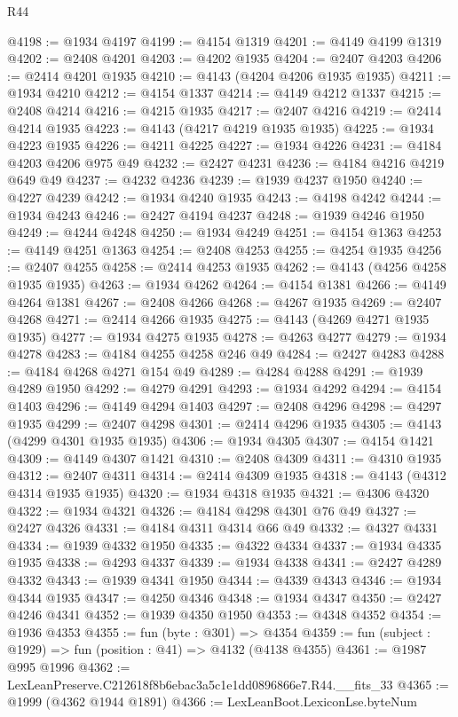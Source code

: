 \begin{lexlean}{R44}
\begin{coremodule}
@4198 := @1934 @4197
@4199 := @4154 @1319
@4201 := @4149 @4199 @1319
@4202 := @2408 @4201
@4203 := @4202 @1935
@4204 := @2407 @4203
@4206 := @2414 @4201 @1935
@4210 := @4143 (@4204 @4206 @1935 @1935)
@4211 := @1934 @4210
@4212 := @4154 @1337
@4214 := @4149 @4212 @1337
@4215 := @2408 @4214
@4216 := @4215 @1935
@4217 := @2407 @4216
@4219 := @2414 @4214 @1935
@4223 := @4143 (@4217 @4219 @1935 @1935)
@4225 := @1934 @4223 @1935
@4226 := @4211 @4225
@4227 := @1934 @4226
@4231 := @4184 @4203 @4206 @975 @49
@4232 := @2427 @4231
@4236 := @4184 @4216 @4219 @649 @49
@4237 := @4232 @4236
@4239 := @1939 @4237 @1950
@4240 := @4227 @4239
@4242 := @1934 @4240 @1935
@4243 := @4198 @4242
@4244 := @1934 @4243
@4246 := @2427 @4194 @4237
@4248 := @1939 @4246 @1950
@4249 := @4244 @4248
@4250 := @1934 @4249
@4251 := @4154 @1363
@4253 := @4149 @4251 @1363
@4254 := @2408 @4253
@4255 := @4254 @1935
@4256 := @2407 @4255
@4258 := @2414 @4253 @1935
@4262 := @4143 (@4256 @4258 @1935 @1935)
@4263 := @1934 @4262
@4264 := @4154 @1381
@4266 := @4149 @4264 @1381
@4267 := @2408 @4266
@4268 := @4267 @1935
@4269 := @2407 @4268
@4271 := @2414 @4266 @1935
@4275 := @4143 (@4269 @4271 @1935 @1935)
@4277 := @1934 @4275 @1935
@4278 := @4263 @4277
@4279 := @1934 @4278
@4283 := @4184 @4255 @4258 @246 @49
@4284 := @2427 @4283
@4288 := @4184 @4268 @4271 @154 @49
@4289 := @4284 @4288
@4291 := @1939 @4289 @1950
@4292 := @4279 @4291
@4293 := @1934 @4292
@4294 := @4154 @1403
@4296 := @4149 @4294 @1403
@4297 := @2408 @4296
@4298 := @4297 @1935
@4299 := @2407 @4298
@4301 := @2414 @4296 @1935
@4305 := @4143 (@4299 @4301 @1935 @1935)
@4306 := @1934 @4305
@4307 := @4154 @1421
@4309 := @4149 @4307 @1421
@4310 := @2408 @4309
@4311 := @4310 @1935
@4312 := @2407 @4311
@4314 := @2414 @4309 @1935
@4318 := @4143 (@4312 @4314 @1935 @1935)
@4320 := @1934 @4318 @1935
@4321 := @4306 @4320
@4322 := @1934 @4321
@4326 := @4184 @4298 @4301 @76 @49
@4327 := @2427 @4326
@4331 := @4184 @4311 @4314 @66 @49
@4332 := @4327 @4331
@4334 := @1939 @4332 @1950
@4335 := @4322 @4334
@4337 := @1934 @4335 @1935
@4338 := @4293 @4337
@4339 := @1934 @4338
@4341 := @2427 @4289 @4332
@4343 := @1939 @4341 @1950
@4344 := @4339 @4343
@4346 := @1934 @4344 @1935
@4347 := @4250 @4346
@4348 := @1934 @4347
@4350 := @2427 @4246 @4341
@4352 := @1939 @4350 @1950
@4353 := @4348 @4352
@4354 := @1936 @4353
@4355 := fun (byte : @301) => @4354
@4359 := fun (subject : @1929) => fun (position : @41) => @4132 (@4138 @4355)
@4361 := @1987 @995 @1996
@4362 := LexLeanPreserve.C212618f8b6ebac3a5c1e1dd0896866e7.R44.__fits_33
@4365 := @1999 (@4362 @1944 @1891)
@4366 := LexLeanBoot.LexiconLse.byteNum

\end{coremodule}
\end{lexlean}
